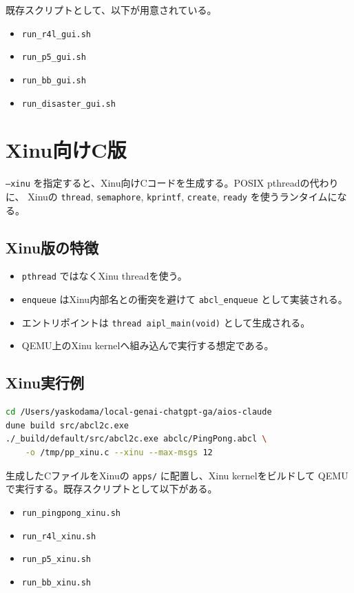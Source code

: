 \documentclass[11pt,a4paper,uplatex,dvipdfmx]{jsarticle}
\begin{document}
既存スクリプトとして、以下が用意されている。

\begin{itemize}
  \item \texttt{run\_r4l\_gui.sh}
  \item \texttt{run\_p5\_gui.sh}
  \item \texttt{run\_bb\_gui.sh}
  \item \texttt{run\_disaster\_gui.sh}
\end{itemize}

\section{Xinu向けC版}

\texttt{--xinu} を指定すると、Xinu向けCコードを生成する。POSIX pthreadの代わりに、
Xinuの \texttt{thread}, \texttt{semaphore}, \texttt{kprintf},
\texttt{create}, \texttt{ready} を使うランタイムになる。

\subsection{Xinu版の特徴}

\begin{itemize}
  \item \texttt{pthread} ではなくXinu threadを使う。
  \item \texttt{enqueue} はXinu内部名との衝突を避けて \texttt{abcl\_enqueue} として実装される。
  \item エントリポイントは \texttt{thread aipl\_main(void)} として生成される。
  \item QEMU上のXinu kernelへ組み込んで実行する想定である。
\end{itemize}

\subsection{Xinu実行例}

\begin{lstlisting}[style=aipl,language=bash]
cd /Users/yaskodama/local-genai-chatgpt-ga/aios-claude
dune build src/abcl2c.exe
./_build/default/src/abcl2c.exe abclc/PingPong.abcl \
    -o /tmp/pp_xinu.c --xinu --max-msgs 12
\end{lstlisting}

生成したCファイルをXinuの \texttt{apps/} に配置し、Xinu kernelをビルドして
QEMUで実行する。既存スクリプトとして以下がある。

\begin{itemize}
  \item \texttt{run\_pingpong\_xinu.sh}
  \item \texttt{run\_r4l\_xinu.sh}
  \item \texttt{run\_p5\_xinu.sh}
  \item \texttt{run\_bb\_xinu.sh}
\end{itemize}
\end{document}
